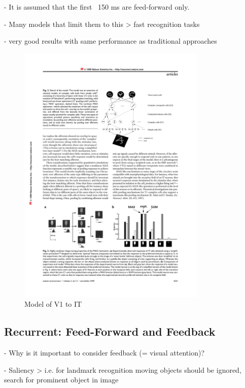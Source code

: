 			- It is assumed that the first ~150 ms are feed-forward only. \cite{thorpe1996speed}
			
			- Many models that limit them to this > fast recognition tasks
			
			- very good results with same performance as traditional approaches

			\begin{figure}[H]
				\centering
				\includegraphics[width=0.8\textwidth, trim= 9cm 18cm 2.5cm 4cm, clip]{images/riesenhuber-poggio-1999-models-p3.pdf}
				\caption{Model of V1 to IT \citep{riesenhuber1999hierarchical}}
			\end{figure}
		
		\subsection{Recurrent: Feed-Forward and Feedback}
		
			- Why is it important to consider feedback (= visual attention)?
			
			- Saliency > i.e. for landmark recognition moving objects should be ignored, search for prominent object in image
			

